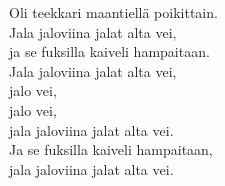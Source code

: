 
            Oli teekkari maantiellä poikittain. \\
            Jala jaloviina jalat alta vei, \\
            ja se fuksilla kaiveli hampaitaan. \\
            Jala jaloviina jalat alta vei, \\
            jalo vei, \\
            jalo vei, \\
            jala jaloviina jalat alta vei. \\
            Ja se fuksilla kaiveli hampaitaan, \\
            jala jaloviina jalat alta vei. \\
